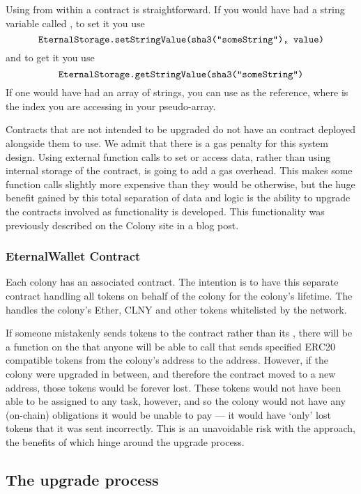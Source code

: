 Using  from within a contract is straightforward. If you would have had a string variable called , to set it you use
\[
\texttt{EternalStorage.setStringValue(sha3("someString"), value)}
\]
and to get it you use
\[
\texttt{EternalStorage.getStringValue(sha3("someString")}
\]
If one would have had an array of strings, you can use  as the reference, where  is the index you are accessing in your pseudo-array.

Contracts that are not intended to be upgraded do not have an  contract deployed alongside them to use. We admit that there is a gas penalty for this system design. Using external function calls to set or access data, rather than using internal storage of the contract, is going to add a gas overhead. This makes some function calls slightly more expensive than they would be otherwise, but the huge benefit gained by this total separation of data and logic is the ability to upgrade the contracts involved as functionality is developed. This functionality was previously described on the Colony site in a blog post\cite{UpgradingContracts}. 

\subsubsection{EternalWallet Contract}
Each colony has an associated  contract. The intention is to have this separate contract handling all tokens on behalf of the colony for the colony's lifetime. The  handles the colony's Ether, CLNY and other tokens whitelisted by the network. 

If someone mistakenly sends tokens to the  contract rather than its , there will be a function on the  that anyone will be able to call that sends specified ERC20 compatible tokens from the colony's address to the  address. However, if the colony were upgraded in between, and therefore the  contract moved to a new address, those tokens would be forever lost. These tokens would not have been able to be assigned to any task, however, and so the colony would not have any (on-chain) obligations it would be unable to pay --- it would have `only' lost tokens that it was sent incorrectly. This is an unavoidable risk with the  approach, the benefits of which hinge around the upgrade process.

\subsection{The upgrade process}

